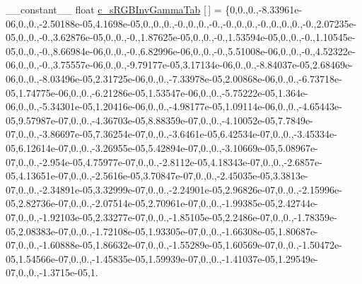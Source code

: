 \begin{DoxyCompactItemize}
\item 
\-\_\-\-\_\-constant\-\_\-\-\_\- float \hyperlink{namespacecv_1_1gpu_1_1device_1_1color__detail_a3071a0458aaa6f50ef14cfdf1bb7e00c}{c\-\_\-s\-R\-G\-B\-Inv\-Gamma\-Tab} \mbox{[}$\,$\mbox{]} = \{0,0.,0.,-\/8.\-33961e-\/06,0.,0.,-\/2.\-50188e-\/05,4.\-1698e-\/05,0.,0.,0.,-\/0.,0.,0.,-\/0.,-\/0.,0.,0.,-\/0.,0.,0.,0.,-\/0.,2.\-07235e-\/05,0.,0.,-\/0.,3.\-62876e-\/05,0.,0.,-\/0.,1.\-87625e-\/05,0.,0.,-\/0.,1.\-53594e-\/05,0.,0.,-\/0.,1.\-10545e-\/05,0.,0.,-\/0.,8.\-66984e-\/06,0.,0.,-\/0.,6.\-82996e-\/06,0.,0.,-\/0.,5.\-51008e-\/06,0.,0.,-\/0.,4.\-52322e-\/06,0.,0.,-\/0.,3.\-75557e-\/06,0.,0.,-\/9.\-79177e-\/05,3.\-17134e-\/06,0.,0.,-\/8.\-84037e-\/05,2.\-68469e-\/06,0.,0.,-\/8.\-03496e-\/05,2.\-31725e-\/06,0.,0.,-\/7.\-33978e-\/05,2.\-00868e-\/06,0.,0.,-\/6.\-73718e-\/05,1.\-74775e-\/06,0.,0.,-\/6.\-21286e-\/05,1.\-53547e-\/06,0.,0.,-\/5.\-75222e-\/05,1.\-364e-\/06,0.,0.,-\/5.\-34301e-\/05,1.\-20416e-\/06,0.,0.,-\/4.\-98177e-\/05,1.\-09114e-\/06,0.,0.,-\/4.\-65443e-\/05,9.\-57987e-\/07,0.,0.,-\/4.\-36703e-\/05,8.\-88359e-\/07,0.,0.,-\/4.\-10052e-\/05,7.\-7849e-\/07,0.,0.,-\/3.\-86697e-\/05,7.\-36254e-\/07,0.,0.,-\/3.\-6461e-\/05,6.\-42534e-\/07,0.,0.,-\/3.\-45334e-\/05,6.\-12614e-\/07,0.,0.,-\/3.\-26955e-\/05,5.\-42894e-\/07,0.,0.,-\/3.\-10669e-\/05,5.\-08967e-\/07,0.,0.,-\/2.\-954e-\/05,4.\-75977e-\/07,0.,0.,-\/2.\-8112e-\/05,4.\-18343e-\/07,0.,0.,-\/2.\-6857e-\/05,4.\-13651e-\/07,0.,0.,-\/2.\-5616e-\/05,3.\-70847e-\/07,0.,0.,-\/2.\-45035e-\/05,3.\-3813e-\/07,0.,0.,-\/2.\-34891e-\/05,3.\-32999e-\/07,0.,0.,-\/2.\-24901e-\/05,2.\-96826e-\/07,0.,0.,-\/2.\-15996e-\/05,2.\-82736e-\/07,0.,0.,-\/2.\-07514e-\/05,2.\-70961e-\/07,0.,0.,-\/1.\-99385e-\/05,2.\-42744e-\/07,0.,0.,-\/1.\-92103e-\/05,2.\-33277e-\/07,0.,0.,-\/1.\-85105e-\/05,2.\-2486e-\/07,0.,0.,-\/1.\-78359e-\/05,2.\-08383e-\/07,0.,0.,-\/1.\-72108e-\/05,1.\-93305e-\/07,0.,0.,-\/1.\-66308e-\/05,1.\-80687e-\/07,0.,0.,-\/1.\-60888e-\/05,1.\-86632e-\/07,0.,0.,-\/1.\-55289e-\/05,1.\-60569e-\/07,0.,0.,-\/1.\-50472e-\/05,1.\-54566e-\/07,0.,0.,-\/1.\-45835e-\/05,1.\-59939e-\/07,0.,0.,-\/1.\-41037e-\/05,1.\-29549e-\/07,0.,0.,-\/1.\-3715e-\/05,1.\
\end{DoxyCompactItemize}
